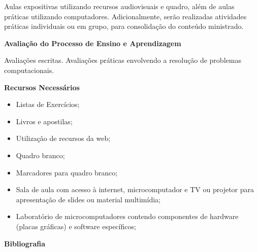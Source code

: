 \noindent
     Aulas expositivas utilizando recursos audiovisuais e quadro, além de aulas práticas utilizando computadores. Adicionalmente, serão realizadas atividades práticas individuais ou em grupo, para consolidação do conteúdo ministrado.

\begin{snugshade}\begin{center}\textbf{
    Avaliação do Processo de Ensino e Aprendizagem
}\end{center}\end{snugshade}

\noindent
   Avaliações escritas. Avaliações práticas envolvendo a resolução de problemas computacionais.
   
\begin{snugshade}\begin{center}\textbf{
    Recursos Necessários
    \vphantom{q} %
}\end{center}\end{snugshade}

\begin{itemize} 
  \item Listas de Exercícios;
  \item Livros e apostilas;
  \item Utilização de recursos da web;
  \item Quadro branco;
  \item Marcadores para quadro branco;
  \item Sala de aula com acesso à internet, microcomputador e TV ou projetor para apresentação de slides ou material multimídia;
  \item Laboratório de microcomputadores contendo componentes de hardware (placas gráficas) e software específicos;
\end{itemize}


\begin{snugshade}\begin{center}\textbf{
    Bibliografia
}\end{center}\end{snugshade}

